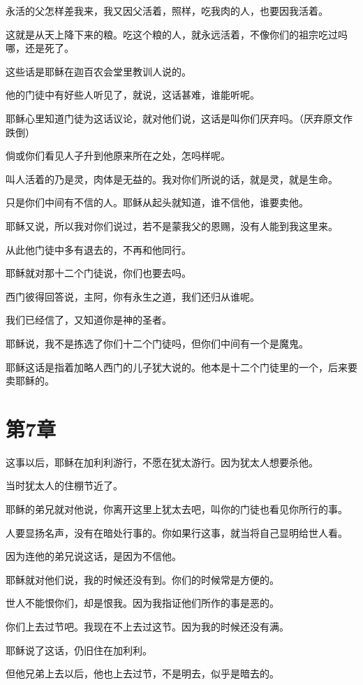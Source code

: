 \documentclass[12pt,oneside]{book}
\begin{document}
永活的父怎样差我来，我又因父活着，照样，吃我肉的人，也要因我活着。

这就是从天上降下来的粮。吃这个粮的人，就永远活着，不像你们的祖宗吃过吗哪，还是死了。

这些话是耶稣在迦百农会堂里教训人说的。

他的门徒中有好些人听见了，就说，这话甚难，谁能听呢。

耶稣心里知道门徒为这话议论，就对他们说，这话是叫你们厌弃吗。（厌弃原文作跌倒）

倘或你们看见人子升到他原来所在之处，怎吗样呢。

叫人活着的乃是灵，肉体是无益的。我对你们所说的话，就是灵，就是生命。

只是你们中间有不信的人。耶稣从起头就知道，谁不信他，谁要卖他。

耶稣又说，所以我对你们说过，若不是蒙我父的恩赐，没有人能到我这里来。

从此他门徒中多有退去的，不再和他同行。

耶稣就对那十二个门徒说，你们也要去吗。

西门彼得回答说，主阿，你有永生之道，我们还归从谁呢。

我们已经信了，又知道你是神的圣者。

耶稣说，我不是拣选了你们十二个门徒吗，但你们中间有一个是魔鬼。

耶稣这话是指着加略人西门的儿子犹大说的。他本是十二个门徒里的一个，后来要卖耶稣的。

\chapter{第7章}
这事以后，耶稣在加利利游行，不愿在犹太游行。因为犹太人想要杀他。

当时犹太人的住棚节近了。

耶稣的弟兄就对他说，你离开这里上犹太去吧，叫你的门徒也看见你所行的事。

人要显扬名声，没有在暗处行事的。你如果行这事，就当将自己显明给世人看。

因为连他的弟兄说这话，是因为不信他。

耶稣就对他们说，我的时候还没有到。你们的时候常是方便的。

世人不能恨你们，却是恨我。因为我指证他们所作的事是恶的。

你们上去过节吧。我现在不上去过这节。因为我的时候还没有满。

耶稣说了这话，仍旧住在加利利。

但他兄弟上去以后，他也上去过节，不是明去，似乎是暗去的。
\end{document}
